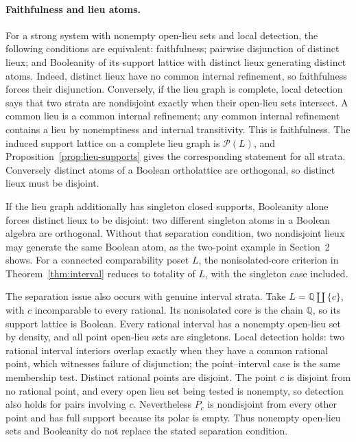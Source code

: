 \paragraph{Faithfulness and lieu atoms.}
For a strong system with nonempty open-lieu sets and local detection,
the following conditions are equivalent: faithfulness; pairwise
disjunction of distinct lieux; and Booleanity of its support lattice
with distinct lieux generating distinct atoms.
Indeed, distinct lieux have no common internal refinement, so
faithfulness forces their disjunction. Conversely, if the lieu
graph is complete, local detection says that two strata are
nondisjoint exactly when their open-lieu sets intersect. A common
lieu is a common internal refinement; any common internal
refinement contains a lieu by nonemptiness and internal
transitivity. This is faithfulness.
The induced support lattice on a complete lieu graph is
$\mathcal P(L)$, and Proposition~\ref{prop:lieu-supports} gives
the corresponding statement for all strata. Conversely distinct
atoms of a Boolean ortholattice are orthogonal, so distinct
lieux must be disjoint.

If the lieu graph additionally has singleton closed supports,
Booleanity alone forces distinct lieux to be disjoint: two
different singleton atoms in a Boolean algebra are orthogonal.
Without that separation condition, two nondisjoint lieux may
generate the same Boolean atom, as the two-point example in
Section~2 shows. For a connected comparability poset $L$, the
nonisolated-core criterion in Theorem~\ref{thm:interval} reduces
to totality of $L$, with the singleton case included.

The separation issue also occurs with genuine interval strata.
Take $L=\mathbb Q\amalg\{c\}$, with $c$ incomparable to every
rational. Its nonisolated core is the chain $\mathbb Q$, so its
support lattice is Boolean. Every rational interval has a nonempty
open-lieu set by density, and all point open-lieu sets are
singletons. Local detection holds: two rational interval interiors
overlap exactly when they have a common rational point, which
witnesses failure of disjunction; the point--interval case is the
same membership test. Distinct rational points are disjoint.
The point $c$ is disjoint from no rational point, and every open
lieu set being tested is nonempty, so detection also holds for
pairs involving $c$. Nevertheless $P_c$ is nondisjoint from every
other point and has full support because its polar is empty.
Thus nonempty open-lieu sets and Booleanity do not replace the
stated separation condition.

